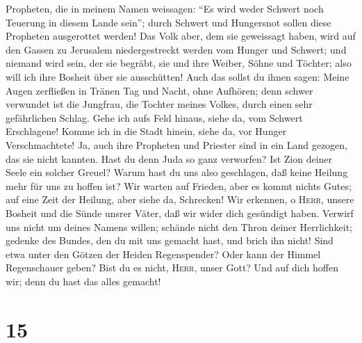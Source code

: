 Propheten, die in meinem Namen weissagen: ``Es wird weder Schwert noch
Teuerung in diesem Lande sein''; durch Schwert und Hungersnot sollen
diese Propheten ausgerottet werden!  Das Volk aber, dem
sie geweissagt haben, wird auf den Gassen zu Jerusalem niedergestreckt
werden vom Hunger und Schwert; und niemand wird sein, der sie begräbt,
sie und ihre Weiber, Söhne und Töchter; also will ich ihre Bosheit über
sie ausschütten!  Auch das sollst du ihnen sagen: Meine
Augen zerfließen in Tränen Tag und Nacht, ohne Aufhören; denn schwer
verwundet ist die Jungfrau, die Tochter meines Volkes, durch einen sehr
gefährlichen Schlag.  Gehe ich aufs Feld hinaus, siehe
da, vom Schwert Erschlagene! Komme ich in die Stadt hinein, siehe da,
vor Hunger Verschmachtete! Ja, auch ihre Propheten und Priester sind in
ein Land gezogen, das sie nicht kannten.  Hast du denn
Juda so ganz verworfen? Ist Zion deiner Seele ein solcher Greuel? Warum
hast du uns also geschlagen, daß keine Heilung mehr für uns zu hoffen
ist? Wir warten auf Frieden, aber es kommt nichts Gutes; auf eine Zeit
der Heilung, aber siehe da, Schrecken!  Wir erkennen, o
\textsc{Herr}, unsere Bosheit und die Sünde unsrer Väter, daß wir wider
dich gesündigt haben.  Verwirf uns nicht um deines Namens
willen; schände nicht den Thron deiner Herrlichkeit; gedenke des Bundes,
den du mit uns gemacht hast, und brich ihn nicht!  Sind
etwa unter den Götzen der Heiden Regenspender? Oder kann der Himmel
Regenschauer geben? Bist du es nicht, \textsc{Herr}, unser Gott? Und auf
dich hoffen wir; denn du hast das alles gemacht!

\hypertarget{section-14}{%
\section{15}\label{section-14}}

